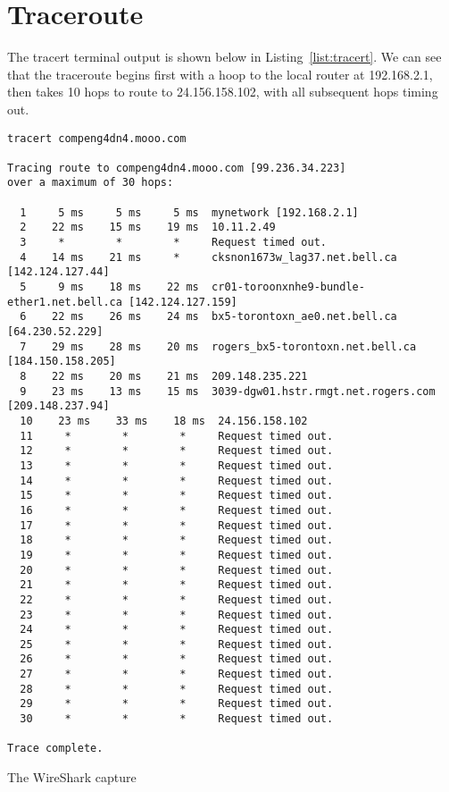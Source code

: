 \section*{Traceroute}
The tracert terminal output is shown below in Listing~\ref{list:tracert}. We can see that the traceroute begins first with a hoop to the local router at 192.168.2.1, then takes 10 hops to route to 24.156.158.102, with all subsequent hops timing out.

\begin{lstlisting}[caption=Traceroute Terminal Output,label=list:tracert]
tracert compeng4dn4.mooo.com

Tracing route to compeng4dn4.mooo.com [99.236.34.223]
over a maximum of 30 hops:

  1     5 ms     5 ms     5 ms  mynetwork [192.168.2.1]
  2    22 ms    15 ms    19 ms  10.11.2.49
  3     *        *        *     Request timed out.
  4    14 ms    21 ms     *     cksnon1673w_lag37.net.bell.ca [142.124.127.44]
  5     9 ms    18 ms    22 ms  cr01-toroonxnhe9-bundle-ether1.net.bell.ca [142.124.127.159]
  6    22 ms    26 ms    24 ms  bx5-torontoxn_ae0.net.bell.ca [64.230.52.229]
  7    29 ms    28 ms    20 ms  rogers_bx5-torontoxn.net.bell.ca [184.150.158.205]
  8    22 ms    20 ms    21 ms  209.148.235.221
  9    23 ms    13 ms    15 ms  3039-dgw01.hstr.rmgt.net.rogers.com [209.148.237.94]
  10    23 ms    33 ms    18 ms  24.156.158.102
  11     *        *        *     Request timed out.
  12     *        *        *     Request timed out.
  13     *        *        *     Request timed out.
  14     *        *        *     Request timed out.
  15     *        *        *     Request timed out.
  16     *        *        *     Request timed out.
  17     *        *        *     Request timed out.
  18     *        *        *     Request timed out.
  19     *        *        *     Request timed out.
  20     *        *        *     Request timed out.
  21     *        *        *     Request timed out.
  22     *        *        *     Request timed out.
  23     *        *        *     Request timed out.
  24     *        *        *     Request timed out.
  25     *        *        *     Request timed out.
  26     *        *        *     Request timed out.
  27     *        *        *     Request timed out.
  28     *        *        *     Request timed out.
  29     *        *        *     Request timed out.
  30     *        *        *     Request timed out.

Trace complete.
\end{lstlisting}

The WireShark capture